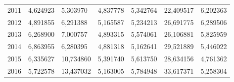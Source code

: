 \begin{table}
\begin{tabular}{p{1cm}p{2cm}p{2cm}p{2cm}p{2cm}p{2cm}p{2cm}}
 2011 &                         4,624923 &      5,303970 &        4,837778 &                                    5,342764 &   22,409517 &                       6,202363 \\
 2012 &                         4,891855 &      6,291388 &        5,165587 &                                    5,234213 &   26,691775 &                       6,289506 \\
 2013 &                         6,268900 &      7,000757 &        4,893315 &                                    5,574061 &   26,106881 &                       5,825959 \\
 2014 &                         6,863955 &      6,280395 &        4,881318 &                                    5,162641 &   29,521889 &                       5,446022 \\
 2015 &                         6,335627 &     10,734860 &        5,391740 &                                    5,613750 &   28,634156 &                       4,761362 \\
 2016 &                         5,722578 &     13,437032 &        5,163005 &                                    5,784948 &   33,617371 &                       5,258304 \\
\bottomrule
\end{tabular}
\end{table}
